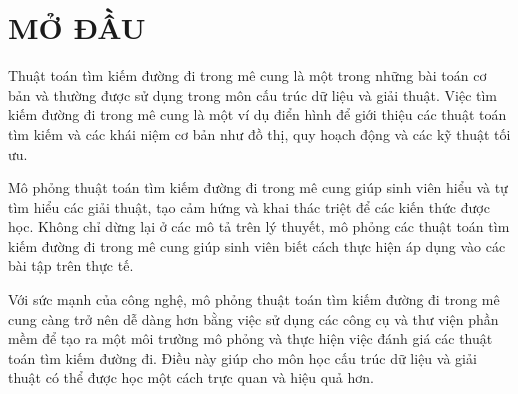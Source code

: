 

\chapter*{MỞ ĐẦU} %

\label{Chapter6} %

Thuật toán tìm kiếm đường đi trong mê cung là một trong những bài toán cơ bản và thường được sử dụng trong môn cấu trúc dữ liệu và giải thuật. Việc tìm kiếm đường đi trong mê cung là một ví dụ điển hình để giới thiệu các thuật toán tìm kiếm và các khái niệm cơ bản như đồ thị, quy hoạch động và các kỹ thuật tối ưu.

Mô phỏng thuật toán tìm kiếm đường đi trong mê cung giúp sinh viên hiểu và tự tìm hiểu các giải thuật, tạo cảm hứng và khai thác triệt để các kiến thức được học. Không chỉ dừng lại ở các mô tả trên lý thuyết, mô phỏng các thuật toán tìm kiếm đường đi trong mê cung giúp sinh viên biết cách thực hiện áp dụng vào các bài tập trên thực tế.

Với sức mạnh của công nghệ, mô phỏng thuật toán tìm kiếm đường đi trong mê cung càng trở nên dễ dàng hơn bằng việc sử dụng các công cụ và thư viện phần mềm để tạo ra một môi trường mô phỏng và thực hiện việc đánh giá các thuật toán tìm kiếm đường đi. Điều này giúp cho môn học cấu trúc dữ liệu và giải thuật có thể được học một cách trực quan và hiệu quả hơn.
